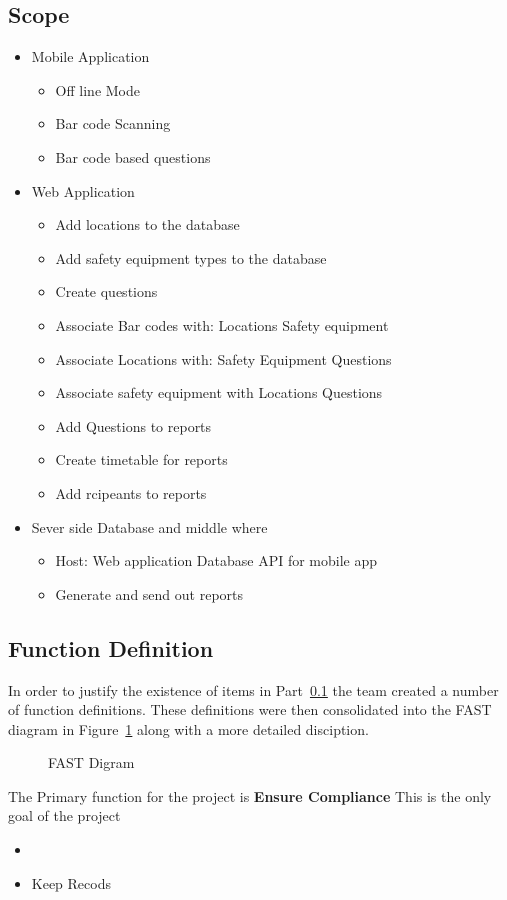 \documentclass[Letter,11pt]{article}
\begin{document}
	\subsection{Scope}\label{scope}
		\begin{itemize}
			\item Mobile Application
			\begin{itemize}
				\item Off line Mode
				\item Bar code Scanning
				\item Bar code based questions
			\end{itemize}
			\item Web Application
			\begin{itemize}
				\item Add locations to the database
				\item Add safety equipment types to the database
				\item Create questions
				\item Associate Bar codes with:
				\subitem Locations
				\subitem Safety equipment
				\item Associate Locations with:
				\subitem Safety Equipment
				\subitem Questions
				\item Associate safety equipment with
				\subitem Locations
				\subitem Questions
				\item Add Questions to reports
				\item Create timetable for reports
				\item Add rcipeants to reports
			\end{itemize}
			\item Sever side Database and middle where
			\begin{itemize}
				\item Host:
				\subitem Web application
				\subitem Database API for mobile app
				\item Generate and send out reports
			\end{itemize}
		\end{itemize}
	\subsection{Function Definition}
		In order to justify the existence of items in Part~\ref{scope} the team created a number of function definitions. These definitions were then consolidated into the FAST diagram in Figure~\ref{fast1} along with a more detailed disciption.
		\begin{figure}[h]
			\centering
			
			\caption{\label{fast1} FAST Digram}
		\end{figure}
		The Primary function for the project is \textbf{Ensure Compliance} This is the only goal of the project 
		\begin{itemize}
			\item
			
			\item Keep Recods
		\end{itemize}
		
\end{document}
